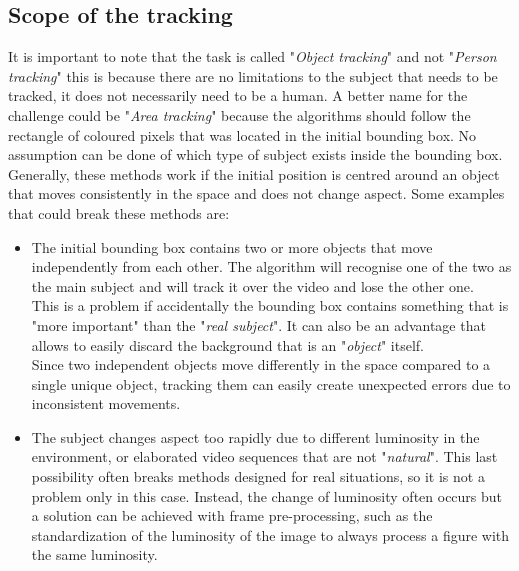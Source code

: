 \subsection{Scope of the tracking}
It is important to note that the task is called "\textit{Object tracking}" and not "\textit{Person tracking}" this is because there are no limitations to the subject that needs to be tracked, it does not necessarily need to be a human. A better name for the challenge could be "\textit{Area tracking}" because the algorithms should follow the rectangle of coloured pixels that was located in the initial bounding box. No assumption can be done of which type of subject exists inside the bounding box.\\
Generally, these methods work if the initial position is centred around an object that moves consistently in the space and does not change aspect. Some examples that could break these methods are:
\begin{itemize}
	\item The initial bounding box contains two or more objects that move independently from each other. The algorithm will recognise one of the two as the main subject and will track it over the video and lose the other one. \\
	This is a problem if accidentally the bounding box contains something that is "more important" than the "\textit{real subject}". It can also be an advantage that allows to easily discard the background that is an "\textit{object}" itself.\\
	Since two independent objects move differently in the space compared to a single unique object, tracking them can easily create unexpected errors due to inconsistent movements.
	\item The subject changes aspect too rapidly due to different luminosity in the environment, or elaborated video sequences that are not "\textit{natural}". This last possibility often breaks methods designed for real situations, so it is not a problem only in this case. Instead, the change of luminosity often occurs but a solution can be achieved with frame pre-processing, such as the standardization of the luminosity of the image to always process a figure with the same luminosity.
\end{itemize}


